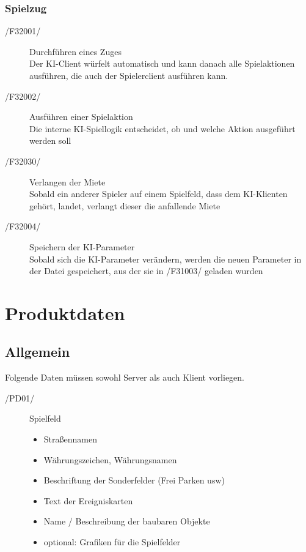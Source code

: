 \documentclass[a4paper,10pt]{article}
\begin{document}
\subsubsection{Spielzug}
\begin{description}
\item[/F32001/] Durchführen eines Zuges\\
Der KI-Client würfelt automatisch und kann danach alle Spielaktionen ausführen, die auch der Spielerclient ausführen kann.
\item[/F32002/] Ausführen einer Spielaktion \\
Die interne KI-Spiellogik entscheidet, ob und welche Aktion ausgeführt werden soll
\item[/F32030/] Verlangen der Miete \\
Sobald ein anderer Spieler auf einem Spielfeld, dass dem KI-Klienten gehört, landet, verlangt dieser die anfallende Miete
\item[/F32004/]Speichern der KI-Parameter \\
Sobald sich die KI-Parameter verändern, werden die neuen Parameter in der Datei gespeichert, aus der sie in /F31003/ geladen wurden
\end{description}

\section{Produktdaten}
\subsection{Allgemein}
Folgende Daten müssen sowohl Server als auch Klient vorliegen.
\begin{description}
\item[/PD01/] Spielfeld
\begin{itemize}
\item Straßennamen
\item Währungszeichen, Währungsnamen
\item Beschriftung der Sonderfelder (Frei Parken usw)
\item Text der Ereigniskarten
\item Name / Beschreibung der baubaren Objekte
\item optional: Grafiken für die Spielfelder
\end{itemize}
\end{description}
\end{document}
